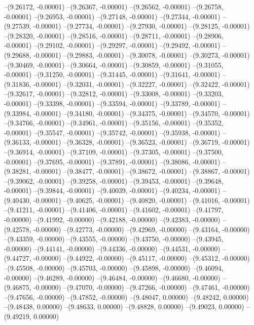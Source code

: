 --(9.26172, -0.00001)
--(9.26367, -0.00001)
--(9.26562, -0.00001)
--(9.26758, -0.00001)
--(9.26953, -0.00001)
--(9.27148, -0.00001)
--(9.27344, -0.00001)
--(9.27539, -0.00001)
--(9.27734, -0.00001)
--(9.27930, -0.00001)
--(9.28125, -0.00001)
--(9.28320, -0.00001)
--(9.28516, -0.00001)
--(9.28711, -0.00001)
--(9.28906, -0.00001)
--(9.29102, -0.00001)
--(9.29297, -0.00001)
--(9.29492, -0.00001)
--(9.29688, -0.00001)
--(9.29883, -0.00001)
--(9.30078, -0.00001)
--(9.30273, -0.00001)
--(9.30469, -0.00001)
--(9.30664, -0.00001)
--(9.30859, -0.00001)
--(9.31055, -0.00001)
--(9.31250, -0.00001)
--(9.31445, -0.00001)
--(9.31641, -0.00001)
--(9.31836, -0.00001)
--(9.32031, -0.00001)
--(9.32227, -0.00001)
--(9.32422, -0.00001)
--(9.32617, -0.00001)
--(9.32812, -0.00001)
--(9.33008, -0.00001)
--(9.33203, -0.00001)
--(9.33398, -0.00001)
--(9.33594, -0.00001)
--(9.33789, -0.00001)
--(9.33984, -0.00001)
--(9.34180, -0.00001)
--(9.34375, -0.00001)
--(9.34570, -0.00001)
--(9.34766, -0.00001)
--(9.34961, -0.00001)
--(9.35156, -0.00001)
--(9.35352, -0.00001)
--(9.35547, -0.00001)
--(9.35742, -0.00001)
--(9.35938, -0.00001)
--(9.36133, -0.00001)
--(9.36328, -0.00001)
--(9.36523, -0.00001)
--(9.36719, -0.00001)
--(9.36914, -0.00001)
--(9.37109, -0.00001)
--(9.37305, -0.00001)
--(9.37500, -0.00001)
--(9.37695, -0.00001)
--(9.37891, -0.00001)
--(9.38086, -0.00001)
--(9.38281, -0.00001)
--(9.38477, -0.00001)
--(9.38672, -0.00001)
--(9.38867, -0.00001)
--(9.39062, -0.00001)
--(9.39258, -0.00001)
--(9.39453, -0.00001)
--(9.39648, -0.00001)
--(9.39844, -0.00001)
--(9.40039, -0.00001)
--(9.40234, -0.00001)
--(9.40430, -0.00001)
--(9.40625, -0.00001)
--(9.40820, -0.00001)
--(9.41016, -0.00001)
--(9.41211, -0.00001)
--(9.41406, -0.00001)
--(9.41602, -0.00001)
--(9.41797, -0.00000)
--(9.41992, -0.00000)
--(9.42188, -0.00000)
--(9.42383, -0.00000)
--(9.42578, -0.00000)
--(9.42773, -0.00000)
--(9.42969, -0.00000)
--(9.43164, -0.00000)
--(9.43359, -0.00000)
--(9.43555, -0.00000)
--(9.43750, -0.00000)
--(9.43945, -0.00000)
--(9.44141, -0.00000)
--(9.44336, -0.00000)
--(9.44531, -0.00000)
--(9.44727, -0.00000)
--(9.44922, -0.00000)
--(9.45117, -0.00000)
--(9.45312, -0.00000)
--(9.45508, -0.00000)
--(9.45703, -0.00000)
--(9.45898, -0.00000)
--(9.46094, -0.00000)
--(9.46289, -0.00000)
--(9.46484, -0.00000)
--(9.46680, -0.00000)
--(9.46875, -0.00000)
--(9.47070, -0.00000)
--(9.47266, -0.00000)
--(9.47461, -0.00000)
--(9.47656, -0.00000)
--(9.47852, -0.00000)
--(9.48047, 0.00000)
--(9.48242, 0.00000)
--(9.48438, 0.00000)
--(9.48633, 0.00000)
--(9.48828, 0.00000)
--(9.49023, 0.00000)
--(9.49219, 0.00000)
